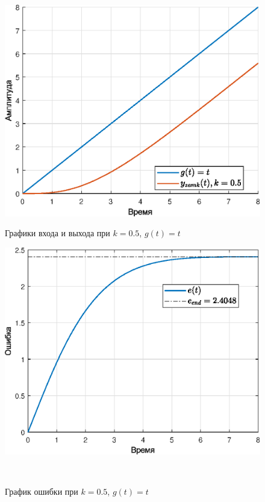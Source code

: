 \documentclass[a4paper]{article}
\begin{document}
\begin{figure}[H]
    \begin{minipage}{0.5\textwidth}
        \centering \includegraphics[width=\textwidth]{ex4/k0.5_g_vt.eps}
        \caption{Графики входа и выхода при $k=0.5$, $g(t)=t$}
    \end{minipage}\hfill
    \begin{minipage}{0.5\textwidth}
        \centering \includegraphics[width=\textwidth]{ex4/k0.5_g_vt_error.eps}
        \caption{График ошибки при $k=0.5$, $g(t)=t$}
    \end{minipage}\\[1em]
\end{figure}\noindent\
\end{document}
